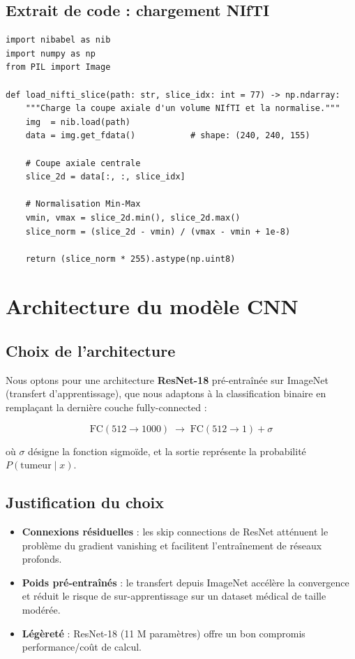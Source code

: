 \documentclass[12pt, a4paper]{report}
\begin{document}
\subsection{Extrait de code : chargement NIfTI}

\begin{lstlisting}[style=pythonStyle, caption={Chargement et normalisation d'une coupe NIfTI.}]
import nibabel as nib
import numpy as np
from PIL import Image

def load_nifti_slice(path: str, slice_idx: int = 77) -> np.ndarray:
    """Charge la coupe axiale d'un volume NIfTI et la normalise."""
    img  = nib.load(path)
    data = img.get_fdata()           # shape: (240, 240, 155)

    # Coupe axiale centrale
    slice_2d = data[:, :, slice_idx]

    # Normalisation Min-Max
    vmin, vmax = slice_2d.min(), slice_2d.max()
    slice_norm = (slice_2d - vmin) / (vmax - vmin + 1e-8)

    return (slice_norm * 255).astype(np.uint8)
\end{lstlisting}

\section{Architecture du modèle CNN}

\subsection{Choix de l'architecture}

Nous optons pour une architecture \textbf{ResNet-18} pré-entraînée sur ImageNet
(transfert d'apprentissage), que nous adaptons à la classification binaire
en remplaçant la dernière couche fully-connected :

\[
  \text{FC}(512 \to 1000) \;\longrightarrow\; \text{FC}(512 \to 1) + \sigma
\]

où $\sigma$ désigne la fonction sigmoïde, et la sortie représente la probabilité
$P(\text{tumeur} \mid x)$.

\subsection{Justification du choix}

\begin{itemize}
  \item \textbf{Connexions résiduelles} : les skip connections de ResNet atténuent
        le problème du gradient vanishing et facilitent l'entraînement de réseaux profonds.
  \item \textbf{Poids pré-entraînés} : le transfert depuis ImageNet accélère la convergence
        et réduit le risque de sur-apprentissage sur un dataset médical de taille modérée.
  \item \textbf{Légèreté} : ResNet-18 (11 M paramètres) offre un bon compromis
        performance/coût de calcul.
\end{itemize}
\end{document}
